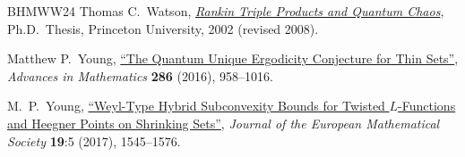 \documentclass[11pt,a4paper]{amsart}
\numberwithin{equation}{section}
\theoremstyle{remark}
\theoremstyle{definition}
\begin{document}
\begin{thebibliography}{BHMWW24}
 Thomas C.~Watson, \href{https://arxiv.org/abs/0810.0425v3}{\textit{Rankin Triple Products and Quantum Chaos}}, Ph.D.~Thesis, Princeton University, 2002 (revised 2008).

 Matthew P.~Young, \href{https://doi.org/10.1016/j.aim.2015.09.013}{``The Quantum Unique Ergodicity Conjecture for Thin Sets''}, \textit{Advances in Mathematics} \textbf{286} (2016), 958--1016.

 M.~P.~Young, \href{https://doi.org/10.4171/JEMS/699}{``Weyl-Type Hybrid Subconvexity Bounds for Twisted $L$-Functions and Heegner Points on Shrinking Sets''}, \textit{Journal of the European Mathematical Society} \textbf{19}:5 (2017), 1545--1576.

\end{thebibliography}
\end{document}
